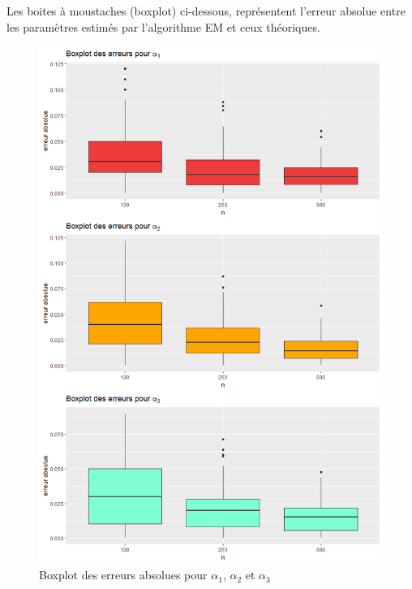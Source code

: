 \documentclass[frenchb]{report}
\newcommand{\1}{\mathbbm{1}}
\theoremstyle{definition}\newtheorem{defn}{Définition}
\theoremstyle{definition}\newtheorem{exm}{Exemple}
\theoremstyle{definition}\newtheorem{nota}{Notation}
\theoremstyle{definition}\newtheorem{rem}{Remarque}
\begin{document}
Les boites à moustaches (boxplot) ci-dessous, représentent l'erreur absolue entre les paramètres estimés par l'algorithme EM et ceux théoriques.

\begin{figure}[H]
	\centering
	\includegraphics[scale=0.5]{images/good_alpha.png}
	\caption{Boxplot des erreurs absolues pour $\alpha_1$, $\alpha_2$ et $\alpha_3$}
\end{figure}
\end{document}
